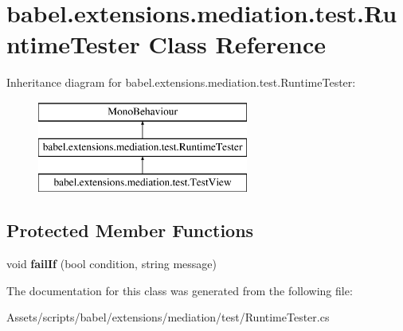 \hypertarget{classbabel_1_1extensions_1_1mediation_1_1test_1_1_runtime_tester}{\section{babel.\-extensions.\-mediation.\-test.\-Runtime\-Tester Class Reference}
\label{classbabel_1_1extensions_1_1mediation_1_1test_1_1_runtime_tester}
}
Inheritance diagram for babel.\-extensions.\-mediation.\-test.\-Runtime\-Tester\-:\begin{figure}[H]
\begin{center}
\leavevmode
\includegraphics[height=3.000000cm]{classbabel_1_1extensions_1_1mediation_1_1test_1_1_runtime_tester}
\end{center}
\end{figure}
\subsection*{Protected Member Functions}
\begin{DoxyCompactItemize}
\item 
\hypertarget{classbabel_1_1extensions_1_1mediation_1_1test_1_1_runtime_tester_ae228cdbf2c998d5c158db7175ad21475}{void {\bfseries fail\-If} (bool condition, string message)}\label{classbabel_1_1extensions_1_1mediation_1_1test_1_1_runtime_tester_ae228cdbf2c998d5c158db7175ad21475}

\end{DoxyCompactItemize}


The documentation for this class was generated from the following file\-:\begin{DoxyCompactItemize}
\item 
Assets/scripts/babel/extensions/mediation/test/Runtime\-Tester.\-cs\end{DoxyCompactItemize}
